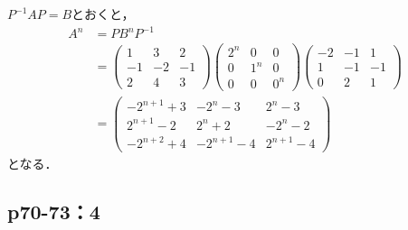 \documentclass[uplatex,dvipdfmx,a4paper,11pt,fleqn]{jsarticle}
\begin{document}
    \begin{tleftbar}
        $P^{-1} A P = B$とおくと，
        \begin{align*}
            A^n &= P B^n P^{-1} \\
            & = \begin{pmatrix} 1 & 3 & 2 \\ -1 & -2 & -1 \\ 2 & 4 & 3 \end{pmatrix} \begin{pmatrix} 2^n & 0 & 0 \\ 0 & 1^n & 0 \\ 0 & 0 & 0^n \end{pmatrix} \begin{pmatrix} -2 & -1 & 1\\ 1 & -1 & -1 \\ 0 & 2 & 1 \end{pmatrix} \\
            & = \begin{pmatrix} -2^{n+1}+3 & -2^n -3 & 2^n -3 \\ 2^{n+1}-2 & 2^n +2 & -2^n -2 \\ -2^{n+2}+4 & -2^{n+1} -4 & 2^{n+1} -4 \end{pmatrix}
        \end{align*}
        となる．
    \end{tleftbar}
    \newpage 


\subsection*{p70-73：4}
\end{document}
